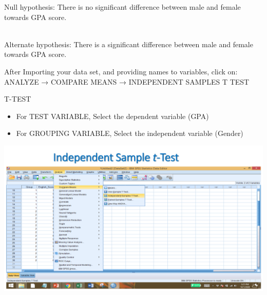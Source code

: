 \documentclass[
  letterpaper,
  DIV=11,
  numbers=noendperiod]{scrreprt}
\providecommand{\tightlist}{%
  \setlength{\itemsep}{0pt}\setlength{\parskip}{0pt}}\usepackage{longtable,booktabs,array}
\begin{document}
\begin{tcolorbox}[enhanced jigsaw, rightrule=.15mm, arc=.35mm, colframe=quarto-callout-note-color-frame, coltitle=black, left=2mm, colbacktitle=quarto-callout-note-color!10!white, bottomtitle=1mm, titlerule=0mm, colback=white, breakable, opacitybacktitle=0.6, opacityback=0, toprule=.15mm, toptitle=1mm, title=\textcolor{quarto-callout-note-color}{\faInfo}\hspace{0.5em}{Hypothesis}, bottomrule=.15mm, leftrule=.75mm]

{Null hypothesis:} {There is no significant difference between male and
female towards GPA score.}\\
\strut \\
{Alternate hypothesis:} {There is a significant difference between male
and female towards GPA score.}\\

\end{tcolorbox}

After Importing your data set, and providing names to variables, click
on:\\

{ANALYZE → COMPARE MEANS → INDEPENDENT SAMPLES T TEST}

T-TEST\\

\begin{itemize}
\tightlist
\item
  For TEST VARIABLE, Select the dependent variable (GPA)\\
\item
  For GROUPING VARIABLE, Select the independent variable (Gender)\\
\end{itemize}

\includegraphics{images/slides/img_Page_096.png}
\end{document}
